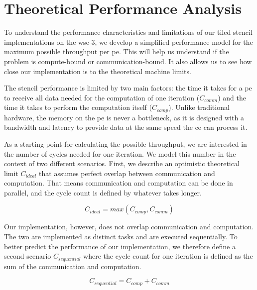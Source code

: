 \chapter{Theoretical Performance Analysis}
\label{sec:theory_performance}
To understand the performance characteristics and limitations of our tiled stencil implementations on the \ac{wse}-3, we develop a simplified performance model for the maximum possible throughput per \ac{pe}. This will help us understand if the problem is compute-bound or communication-bound. It also allows us to see how close our implementation is to the theoretical machine limits.

The stencil performance is limited by two main factors: the time it takes for a \ac{pe} to receive all data needed for the computation of one iteration ($C_{comm}$) and the time it takes to perform the computation itself ($C_{comp}$). Unlike traditional hardware, the memory on the \ac{pe} is never a bottleneck, as it is designed with a bandwidth and latency to provide data at the same speed the \ac{ce} can process it.

As a starting point for calculating the possible throughput, we are interested in the number of cycles needed for one iteration. We model this number in the context of two different scenarios. First, we describe an optimistic theoretical limit $C_{ideal}$ that assumes perfect overlap between communication and computation. That means communication and computation can be done in parallel, and the cycle count is defined by whatever takes longer.

\begin{equation}
    \label{eq:c_ideal}
    C_{ideal} = max\left(C_{comp}, C_{comm}\right)
\end{equation}


Our implementation, however, does not overlap communication and computation. The two are implemented as distinct tasks and are executed sequentially. To better predict the performance of our implementation, we therefore define a second scenario $C_{sequential}$ where the cycle count for one iteration is defined as the sum of the communication and computation.

\begin{equation}
    \label{eq:c_sequential}
    C_{sequential} = C_{comp} + C_{comm}
\end{equation}

